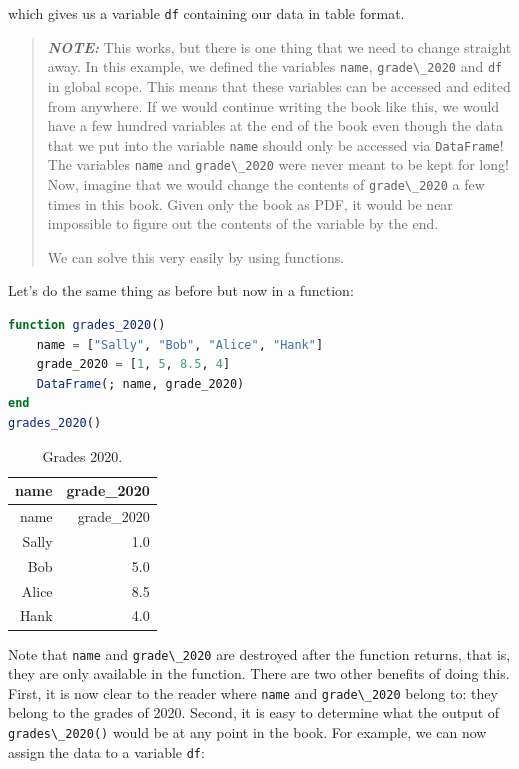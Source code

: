 \documentclass[
  notoc %
]{tufte-book}
\newcommand{\passthrough}[1]{#1}
\begin{document}
which gives us a variable \passthrough{\lstinline!df!} containing our
data in table format.

\begin{quote}
\textbf{\emph{NOTE:}} This works, but there is one thing that we need to
change straight away. In this example, we defined the variables
\passthrough{\lstinline!name!}, \passthrough{\lstinline!grade\_2020!}
and \passthrough{\lstinline!df!} in global scope. This means that these
variables can be accessed and edited from anywhere. If we would continue
writing the book like this, we would have a few hundred variables at the
end of the book even though the data that we put into the variable
\passthrough{\lstinline!name!} should only be accessed via
\passthrough{\lstinline!DataFrame!}! The variables
\passthrough{\lstinline!name!} and \passthrough{\lstinline!grade\_2020!}
were never meant to be kept for long! Now, imagine that we would change
the contents of \passthrough{\lstinline!grade\_2020!} a few times in
this book. Given only the book as PDF, it would be near impossible to
figure out the contents of the variable by the end.

We can solve this very easily by using functions.
\end{quote}

Let's do the same thing as before but now in a function:

\begin{lstlisting}[language=Julia]
function grades_2020()
    name = ["Sally", "Bob", "Alice", "Hank"]
    grade_2020 = [1, 5, 8.5, 4]
    DataFrame(; name, grade_2020)
end
grades_2020()
\end{lstlisting}

\hypertarget{tbl:grades_2020}{}
\begin{longtable}[]{@{}rr@{}}
\caption{\label{tbl:grades_2020}Grades 2020.}\tabularnewline
\toprule
name & grade\_2020 \\
\midrule
\endfirsthead
\toprule
name & grade\_2020 \\
\midrule
\endhead
Sally & 1.0 \\
Bob & 5.0 \\
Alice & 8.5 \\
Hank & 4.0 \\
\bottomrule
\end{longtable}

Note that \passthrough{\lstinline!name!} and
\passthrough{\lstinline!grade\_2020!} are destroyed after the function
returns, that is, they are only available in the function. There are two
other benefits of doing this. First, it is now clear to the reader where
\passthrough{\lstinline!name!} and \passthrough{\lstinline!grade\_2020!}
belong to: they belong to the grades of 2020. Second, it is easy to
determine what the output of \passthrough{\lstinline!grades\_2020()!}
would be at any point in the book. For example, we can now assign the
data to a variable \passthrough{\lstinline!df!}:
\end{document}
